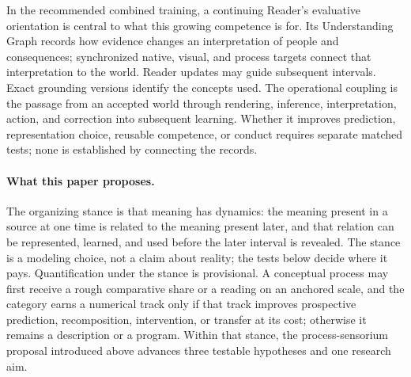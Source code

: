 \documentclass[10pt]{article}
\begin{document}
In the recommended combined training, a continuing Reader's evaluative
orientation is central to what this growing competence is for. Its
Understanding Graph records how evidence changes an interpretation of people
and consequences; synchronized native, visual, and process targets connect
that interpretation to the world. Reader updates may guide subsequent
intervals. Exact grounding
versions identify the concepts used. The operational coupling is
the passage from an accepted world through rendering, inference,
interpretation, action, and correction into subsequent learning. Whether it
improves prediction, representation choice, reusable competence, or conduct
requires separate matched tests; none is established by connecting the records.

\paragraph{What this paper proposes.}
The organizing stance is that meaning has dynamics: the meaning present in a
source at one time is related to the meaning present later, and that relation
can be represented, learned, and used before the later interval is revealed.
The stance is a modeling choice, not a claim about reality; the tests below
decide where it pays. Quantification under the stance is provisional. A conceptual
process may first receive a rough comparative share or a reading on an anchored
scale, and the category
earns a numerical track only if that track improves prospective prediction,
recomposition, intervention, or transfer at its cost; otherwise it remains a
description or a program. Within that stance, the process-sensorium proposal
introduced above advances three testable hypotheses
and one research aim.
\end{document}
